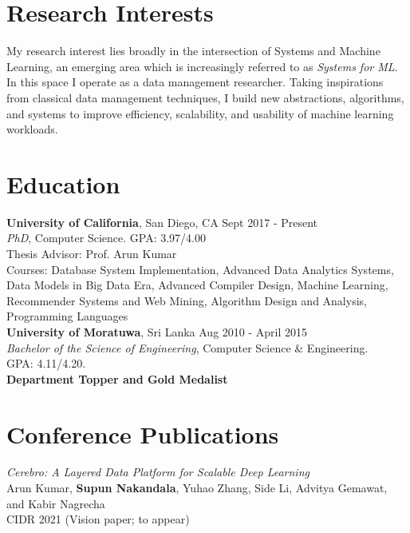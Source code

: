 \documentclass[margin]{res}
\begin{document}

\address{Phone: (+1) 812-558-6888\\ Email: snakanda@eng.ucsd.edu\\ Web: \href{https://scnakandala.github.io}{scnakandala.github.io}}
\address{3232 EBU3B CSE\\9500 Gilman Drive\\La Jolla, CA 92093}


\begin{resume}
\vspace{-2mm}
\section{Research Interests}
My research interest lies broadly in the intersection of Systems and Machine Learning, an emerging area which is increasingly referred to as \textit{Systems for ML}. In this space I operate as a data management researcher.
Taking inspirations from classical data management techniques, I build new abstractions, algorithms, and systems to improve efficiency, scalability, and usability of machine learning workloads.


\section{Education}
\textbf{University of California}, San Diego, CA \hfill Sept 2017 - Present
\\ 
{\sl PhD}, Computer Science. GPA: 3.97/4.00 
\\
Thesis Advisor: Prof. Arun Kumar\\
Courses: Database System Implementation, Advanced Data Analytics Systems, Data Models in Big Data Era, Advanced Compiler Design, Machine Learning, Recommender Systems and Web Mining, Algorithm Design and Analysis, Programming Languages
\vspace{4mm}
\\
\textbf{University of Moratuwa}, Sri Lanka \hfill Aug 2010 - April 2015
\\
{\sl Bachelor of the Science of Engineering}, Computer Science \& Engineering. \\ GPA: 4.11/4.20.
\\ \textbf{Department Topper and Gold Medalist}



\section{Conference Publications}
\par
\textit{Cerebro: A Layered Data Platform for Scalable Deep Learning} \\
Arun Kumar, \textbf{Supun Nakandala}, Yuhao Zhang,  Side Li, Advitya Gemawat, and Kabir
Nagrecha\\
CIDR 2021 (Vision paper; to appear)



\end{resume}
\end{document}

